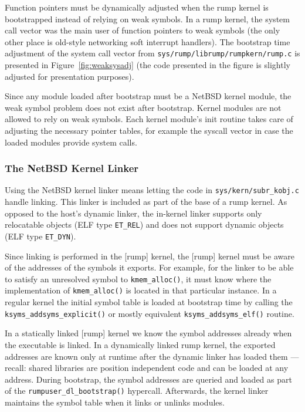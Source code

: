 Function pointers must be dynamically adjusted when the
rump kernel is bootstrapped instead of relying on weak symbols.
In a rump kernel, the system call vector was the main user of
function pointers to weak symbols (the only other place is old-style
networking soft interrupt handlers).  The bootstrap time adjustment
of the system call vector from \texttt{sys/rump/librump/rumpkern/rump.c}
is presented in Figure~\ref{fig:weaksysadj} (the code presented in the figure is
slightly adjusted for presentation purposes).

Since any module loaded after bootstrap must be a NetBSD kernel
module, the weak symbol problem does not exist after bootstrap.
Kernel modules are not allowed to rely on weak symbols.
Each kernel module's init routine takes care of adjusting the
necessary pointer tables, for example the syscall vector in case the
loaded modules provide system calls.

\subsubsection*{The NetBSD Kernel Linker}

Using the NetBSD kernel linker means letting the code in
\verb+sys/kern/subr_kobj.c+ handle linking.  This linker is included
as part of the base of a rump kernel.  As opposed to the host's dynamic
linker, the in-kernel linker supports only relocatable objects (ELF
type \verb+ET_REL+) and does not support dynamic objects (ELF type
\verb+ET_DYN+).

Since linking is performed in the [rump] kernel, the [rump] kernel
must be aware of the addresses of the symbols it exports.  For
example, for the linker to be able to satisfy an unresolved symbol
to \verb+kmem_alloc()+, it must know where the implementation of
\verb+kmem_alloc()+ is located in that particular instance.  In a
regular kernel the initial symbol table is loaded at bootstrap time
by calling the \verb+ksyms_addsyms_explicit()+ or mostly equivalent
\verb+ksyms_addsyms_elf()+ routine.

In a statically linked [rump] kernel we know the symbol addresses
already when the executable is linked.  In a dynamically linked
rump kernel, the exported addresses are known only at runtime after
the dynamic linker has loaded them --- recall: shared libraries
are position independent code and can be loaded at any address.
During bootstrap, the symbol addresses are queried and loaded as
part of the \verb+rumpuser_dl_bootstrap()+ hypercall.  Afterwards,
the kernel linker maintains the symbol table when it links or
unlinks modules.

